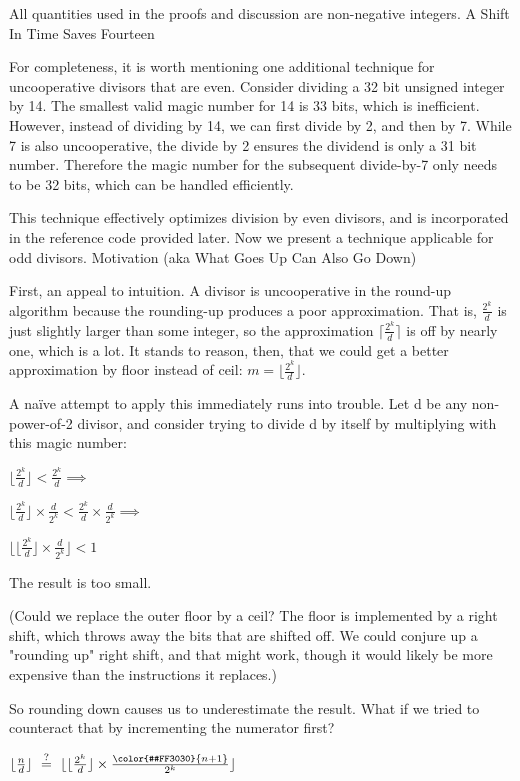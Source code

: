 All quantities used in the proofs and discussion are non-negative integers.
A Shift In Time Saves Fourteen

For completeness, it is worth mentioning one additional technique for uncooperative divisors that are even. Consider dividing a 32 bit unsigned integer by 14. The smallest valid magic number for 14 is 33 bits, which is inefficient. However, instead of dividing by 14, we can first divide by 2, and then by 7. While 7 is also uncooperative, the divide by 2 ensures the dividend is only a 31 bit number. Therefore the magic number for the subsequent divide-by-7 only needs to be 32 bits, which can be handled efficiently.

This technique effectively optimizes division by even divisors, and is incorporated in the reference code provided later. Now we present a technique applicable for odd divisors.
Motivation (aka What Goes Up Can Also Go Down)

First, an appeal to intuition. A divisor is uncooperative in the round-up algorithm because the rounding-up produces a poor approximation. That is, $\frac {2^k} d$ is just slightly larger than some integer, so the approximation $\lceil \frac {2^k} d \rceil$ is off by nearly one, which is a lot. It stands to reason, then, that we could get a better approximation by floor instead of ceil: $m = \lfloor \frac {2^k} d \rfloor$.

A naïve attempt to apply this immediately runs into trouble. Let d be any non-power-of-2 divisor, and consider trying to divide d by itself by multiplying with this magic number:

$ \lfloor \frac {2^k} d \rfloor < \frac {2^k} d \implies $

$ \lfloor \frac {2^k} d \rfloor \times \frac d {2^k} < \frac {2^k} d \times \frac d {2^k} \implies $

$ \lfloor \lfloor \frac {2^k} d \rfloor \times \frac d {2^k} \rfloor < 1 $

The result is too small.

(Could we replace the outer floor by a ceil? The floor is implemented by a right shift, which throws away the bits that are shifted off. We could conjure up a "rounding up" right shift, and that might work, though it would likely be more expensive than the instructions it replaces.)

So rounding down causes us to underestimate the result. What if we tried to counteract that by incrementing the numerator first?

$\lfloor \frac n d \rfloor \ \stackrel{?}{=} \ \lfloor \lfloor \frac {2^k} d \rfloor \times \frac {\color{#FF3030}{n+1}} {2^k} \rfloor $

